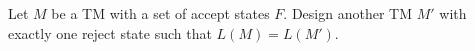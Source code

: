 Let $M$ be a TM with a set of accept states $F$.
Design another TM $M'$ with exactly one reject state such that
$L(M) = L(M')$.
